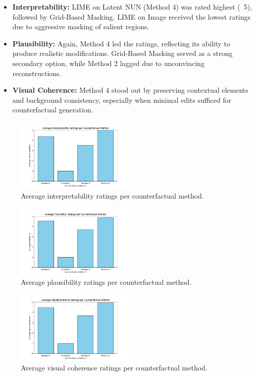 \begin{itemize}
    \item \textbf{Interpretability:} LIME on Latent NUN (Method 4) was rated highest (~5), followed by Grid-Based Masking. LIME on Image received the lowest ratings due to aggressive masking of salient regions.
    \item \textbf{Plausibility:} Again, Method 4 led the ratings, reflecting its ability to produce realistic modifications. Grid-Based Masking served as a strong secondary option, while Method 2 lagged due to unconvincing reconstructions.
    \item \textbf{Visual Coherence:} Method 4 stood out by preserving contextual elements and background consistency, especially when minimal edits sufficed for counterfactual generation.
\end{itemize}

\begin{figure}[h]
    \centering
    \includegraphics[width=0.5\textwidth]{img/human_rating_results/Interpretability_ratings.png}
    \caption{Average interpretability ratings per counterfactual method.}
    \label{fig:cf_interpretability}
\end{figure}

\begin{figure}[h]
    \centering
    \includegraphics[width=0.5\textwidth]{img/human_rating_results/Plausibility_ratings.png}
    \caption{Average plausibility ratings per counterfactual method.}
    \label{fig:cf_plausibility}
\end{figure}

\begin{figure}[h]
    \centering
    \includegraphics[width=0.5\textwidth]{img/human_rating_results/VisualCoherence_ratings.png}
    \caption{Average visual coherence ratings per counterfactual method.}
    \label{fig:cf_visualcoherence}
\end{figure}

